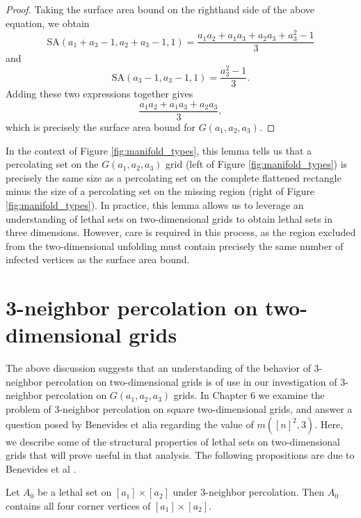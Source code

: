 \begin{proof}
Taking the surface area bound on the righthand side of the above equation, we obtain
$$\text{SA}(a_1+a_3-1, a_2+a_3-1, 1) = \frac{a_1a_2 + a_1a_3 + a_2a_3 + a_3^2 -1}{3}$$
and
$$\text{SA}(a_3-1, a_3-1, 1) = \frac{a_3^2 -1}{3}.$$
Adding these two expressions together gives
$$\frac{a_1a_2 + a_1a_3 + a_2a_3}{3},$$
which is precisely the surface area bound for $G(a_1, a_2, a_3)$. 
\end{proof}

In the context of Figure \ref{fig:manifold_types}, this lemma tells us that a percolating set on the $G(a_1,a_2,a_3)$ grid (left of Figure \ref{fig:manifold_types}) is precisely the same size as a percolating set on the complete flattened rectangle minus the size of a percolating set on the missing region (right of Figure \ref{fig:manifold_types}). In practice, this lemma allows us to leverage an understanding of lethal sets on two-dimensional grids to obtain lethal sets in three dimensions. However, care is required in this process, as the region excluded from the two-dimensional unfolding must contain precisely the same number of infected vertices as the surface area bound.

\section{3-neighbor percolation on two-dimensional grids}

The above discussion suggests that an understanding of the behavior of 3-neighbor percolation on two-dimensional grids is of use in our investigation of 3-neighbor percolation on $G(a_1,a_2,a_3)$ grids. In Chapter 6 we examine the problem of 3-neighbor percolation on square two-dimensional grids, and answer a question posed by Benevides et alia regarding the value of $m([n]^2, 3)$. Here, we describe some of the structural properties of lethal sets on two-dimensional grids that will prove useful in that analysis. The following propositions are due to Benevides et al \cite{benevides}. 

\begin{prop}
\label{prop:corners}
Let $A_0$ be a lethal set on $[a_1] \times [a_2]$ under 3-neighbor percolation. Then $A_0$ contains all four corner vertices of $[a_1] \times [a_2]$.
\end{prop}

